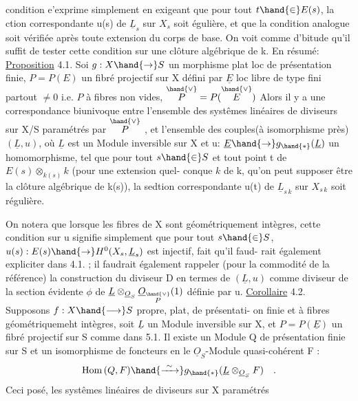 
condition e'exprime simplement en exigeant que pour tout $t\hand{\in} E(s)$,
la ction correspondante u(s) de $\underline{L}_s$ sur $X_s$ soit égulière, et que la
condition analogue soit vérifiée après toute extension du corps de base.
On voit comme d'bitude qu'il suffit de tester cette condition sur une
clôture algébrique de k. En résumé:
\uline{Proposition} 4.1. Soi $g:X\hand{\to} S$ un morphisme plat loc de présentation
finie, $P=P(E)$ un fibré projectif sur X défini par $\underline{E}$ loc libre de type
fini partout $\neq 0$ i.e. $P$ à fibres non vides, $\overset{\hand{\vee}}{P} = P(\overset{\hand{\vee}}{E})$ \hand{,} Alors il y a une correspondance biunivoque entre
l'ensemble des systêmes linéaires de diviseurs sur X/S paramétrés par $\overset{\hand{\vee}}{P}$ ,
et l'ensemble des couples(à isomorphisme près) $(\underline{L},u)$, où $\underline{L}$ est un
Module inversible sur X et u: $\underline{E}\hand{\to} g_{\hand{*}}(\underline{L})$ un homomorphisme, tel que
pour tout $s\hand{\in} S$ et tout point t de $E(s)\otimes_{k(s)}k$ (pour une extension quel-%
\placedmargin{$\cdot$} conque $k$ de k, qu'on peut supposer être la clôture algébrique de k(s)),
la sedtion correspondante u(t) de $\underline{L}_{s\,k}$ sur $X_{s\,k}$ soit régulière.

On notera que lorsque les fibres de X sont 
géométriquement intègres, cette condition sur u signifie simplement que
pour tout $s\hand{\in} S$, $u(s): E(s)\hand{\rightarrow} H^{0}(X_s,\underline{L}_s)$ est injectif, fait qu'il faud-%
rait également expliciter dans 4.1. ;  il faudrait également rappeler
(pour la commodité de la référence) la construction du diviseur D en
termes de $(\underline{L},u)$ comme diviseur de la section évidente $\phi$ de $\underline{L}\otimes_{\underline{O}_S}\underline{O}_{\overset{\hand{\vee}}{P}}(1)$
définie par u.
\uline{Corollaire} 4.2.  Supposons $f: X\hand{\longrightarrow} S$ propre, plat, de présentati-%
on finie et à fibres géométriquemeht intègres,  soit $\underline{L}$ un Module
inversible sur X, et $P=P(\underline{E})$ un fibré projectif sur S comme dans 5.1.
 Il existe un Module Q de présentation finie sur S et un
isomorphisme de foncteurs en le $\underline{O}_S$-Module quasi-cohérent F :
\[ \mathrm{Hom}\,(Q,F) \hand{\xrightarrow{\ \sim\ }} g_{\hand{*}}(\underline{L}\otimes_{\underline{O}_S}F) \quad . \]
Ceci posé, les  systêmes linéaires de diviseurs sur X paramétrés

